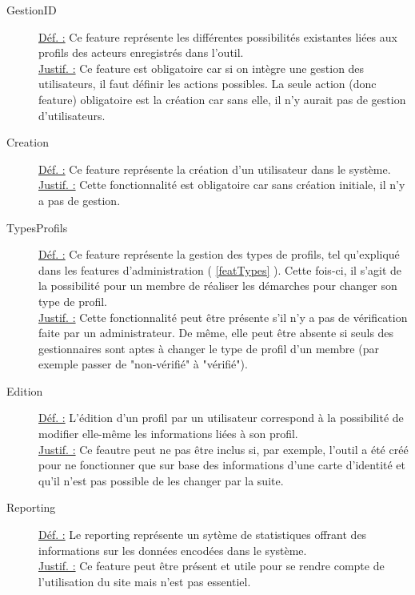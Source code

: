 \begin{description}
\item [GestionID]
\underline{Déf. :}  Ce feature représente les différentes possibilités existantes liées aux profils des acteurs enregistrés dans l'outil.  
\\ \underline{Justif. :}  Ce feature est obligatoire car si on intègre une gestion des utilisateurs,  il faut définir les actions possibles.  La seule action (donc feature) obligatoire est la création car sans elle,  il n'y aurait pas de gestion d'utilisateurs.  
\newline

\item [Creation]
\underline{Déf. :}  Ce feature représente la création d'un utilisateur dans le système.
\\ \underline{Justif. :}  Cette fonctionnalité est obligatoire car sans création initiale,   il n'y a pas de gestion. 
\newline

\item [TypesProfils]
\underline{Déf. :}   Ce feature représente la gestion des types de profils,  tel qu'expliqué dans les features d'administration ( \ref{featTypes} ).  Cette fois-ci,  il s'agit de la possibilité pour un membre de réaliser les démarches pour changer son type de profil.
\\ \underline{Justif. :}  Cette fonctionnalité peut être présente s'il n'y a pas de vérification faite par un administrateur.  De même,  elle peut être absente si seuls des gestionnaires sont aptes à changer le type de profil d'un membre (par exemple passer de "non-vérifié" à "vérifié").  
\newline

\item [Edition]
\underline{Déf. :}  L'édition d'un profil par un utilisateur correspond à la possibilité de modifier elle-même les informations liées à son profil.  
\\ \underline{Justif. :}  Ce feautre peut ne pas être inclus si,  par exemple,  l'outil a été créé pour ne fonctionner que sur base des informations d'une carte d'identité et qu'il n'est pas possible de les changer par la suite.
\newline

\begin{center}
\end{center}

\item [Reporting]
\underline{Déf. :}  Le reporting représente un sytème de statistiques offrant des informations sur les données encodées dans le système.  
\\ \underline{Justif. :}  Ce feature peut être présent et utile pour se rendre compte de l'utilisation du site mais n'est pas essentiel.
\newline


\end{description}
